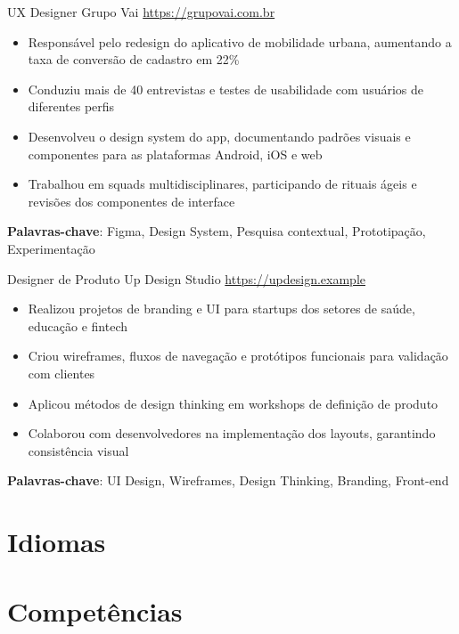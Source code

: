 \documentclass[a4paper, serif, 10pt]{moderncv}
\begin{document}
        {UX Designer}
        {Grupo Vai}
        {\url{https://grupovai.com.br}}
        {}
        {\begin{itemize}
\item Responsável pelo redesign do aplicativo de mobilidade urbana, aumentando a taxa de conversão de cadastro em 22\%
\item Conduziu mais de 40 entrevistas e testes de usabilidade com usuários de diferentes perfis
\item Desenvolveu o design system do app, documentando padrões visuais e componentes para as plataformas Android, iOS e web
\item Trabalhou em squads multidisciplinares, participando de rituais ágeis e revisões dos componentes de interface
\end{itemize}
\textbf{Palavras-chave}: Figma, Design System, Pesquisa contextual, Prototipação, Experimentação}

        {Designer de Produto}
        {Up Design Studio}
        {\url{https://updesign.example}}
        {}
        {\begin{itemize}
\item Realizou projetos de branding e UI para startups dos setores de saúde, educação e fintech
\item Criou wireframes, fluxos de navegação e protótipos funcionais para validação com clientes
\item Aplicou métodos de design thinking em workshops de definição de produto
\item Colaborou com desenvolvedores na implementação dos layouts, garantindo consistência visual
\end{itemize}
\textbf{Palavras-chave}: UI Design, Wireframes, Design Thinking, Branding, Front-end}
\section{Idiomas}

\section{Competências}
\end{document}
